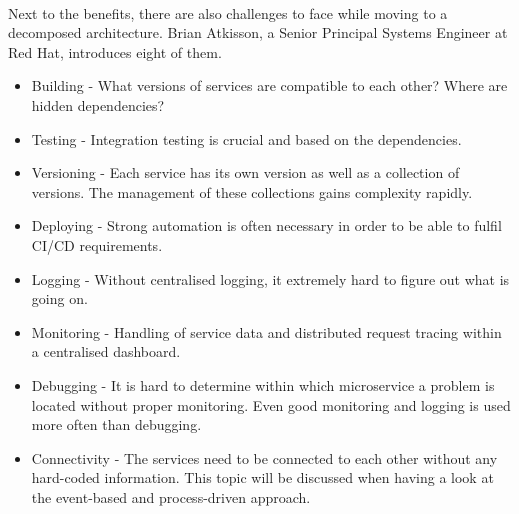 \\
Next to the benefits, there are also challenges to face while moving to a decomposed architecture. Brian Atkisson, a Senior Principal Systems Engineer at Red Hat, introduces eight of them. 
\begin{itemize}
    \item Building - What versions of services are compatible to each other? Where are hidden dependencies?
    \item Testing - Integration testing is crucial and based on the dependencies. 
    \item Versioning - Each service has its own version as well as a collection of versions. The management of these collections gains complexity rapidly.
    \item Deploying - Strong automation is often necessary in order to be able to fulfil CI/CD requirements.
    \item Logging - Without centralised logging, it extremely hard to figure out what is going on.
    \item Monitoring - Handling of service data and distributed request tracing within a centralised dashboard.
    \item Debugging - It is hard to determine within which microservice  a problem is located without proper monitoring. Even good monitoring and logging is used more often than debugging.
    \item Connectivity - The services need to be connected to each other without any hard-coded information. This topic will be discussed when having a look at the event-based and process-driven approach. 
\end{itemize}
\cite{ChallengesMicroservices}

